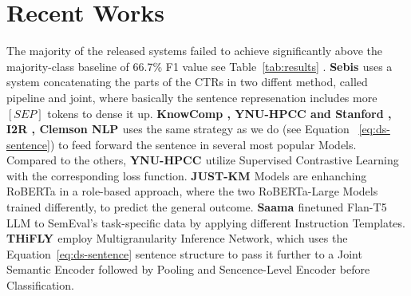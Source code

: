 \section{Recent Works}\label{sec:recentworks}


The majority of the released systems failed to achieve significantly above the majority-class baseline of 66.7\%
F1 value see Table~\ref{tab:results} \cite{jullien_semeval-2023_nodate}.
\textbf{Sebis \cite{vladika_sebis_2023}} uses a system concatenating the parts of the CTRs in two diffent method, called pipeline and joint, 
where basically the sentence represenation includes more $[SEP]$ tokens to dense it up.
\textbf{KnowComp \cite{wang_knowcomp_2023}, YNU-HPCC \cite{feng_ynu-hpcc_nodate} and Stanford \cite{takehana_stanford_2023}, I2R \cite{rajamanickam_i2r_2023}, Clemson NLP \cite{alameldin_clemson_nodate}} uses the same strategy as we do (see Equation ~\ref{eq:ds-sentence}) to feed forward the sentence in several most popular Models.
Compared to the others, \textbf{YNU-HPCC \cite{feng_ynu-hpcc_nodate}} utilize Supervised Contrastive Learning with the corresponding loss function.
\textbf{JUST-KM \cite{alissa_just-km_2023}} Models are enhanching RoBERTa in a role-based approach, where the two RoBERTa-Large Models trained differently, 
to predict the general outcome.
\textbf{Saama \cite{kanakarajan_saama_2023}} finetuned Flan-T5 LLM to SemEval's task-specific data by applying different Instruction Templates. 
\textbf{THiFLY \cite{zhou_thifly_2023}} employ Multigranularity Inference Network, which uses the Equation~\ref{eq:ds-sentence} sentence structure to pass
it further to a Joint Semantic Encoder followed by Pooling and Sencence-Level Encoder before Classification.




